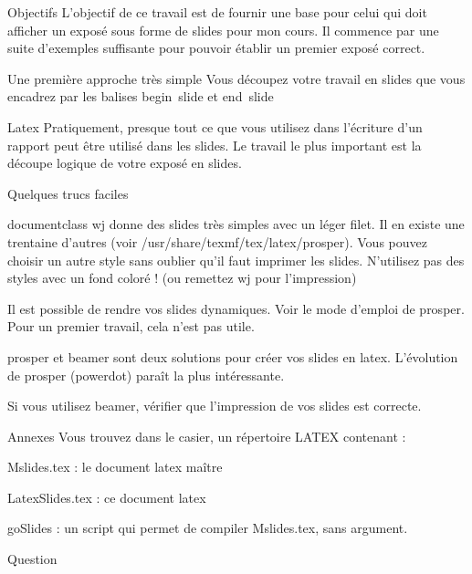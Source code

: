
\begin{slide}{Objectifs}
L'objectif de ce travail est de fournir une base pour celui qui doit afficher un exposé sous forme de slides pour mon cours. Il commence par une suite d'exemples suffisante pour pouvoir établir un premier exposé correct. 
\end{slide}
\begin{slide}{Une première approche très simple}
Vous découpez votre travail en slides que vous encadrez par les balises begin~slide et end~slide
\end{slide}
\begin{slide}{Latex}
Pratiquement, presque tout ce que vous utilisez dans l'écriture d'un rapport peut être utilisé dans les slides. Le travail le plus important est la découpe logique de votre exposé en slides.
\end{slide}
\begin{slide}{Quelques trucs faciles}
\begin{list}{-}{}
\item documentclass wj donne des slides très simples avec un léger filet. Il en existe une trentaine d'autres (voir /usr/share/texmf/tex/latex/prosper). Vous pouvez choisir un autre style sans oublier qu'il faut imprimer les slides. N'utilisez pas des styles avec un fond coloré ! (ou remettez wj pour l'impression)
\item Il est possible de rendre vos slides dynamiques. Voir le mode d'emploi de prosper. Pour un premier travail, cela n'est pas utile.
\item prosper et beamer sont deux solutions pour créer vos slides en latex. L'évolution de prosper (powerdot) paraît la plus intéressante. 
\item Si vous utilisez beamer, vérifier que l'impression de vos slides est correcte.
\end{list}
\end{slide}
\begin{slide}{Annexes}
Vous trouvez dans le casier, un répertoire LATEX contenant :
\begin{list}{-}{}
\item Mslides.tex : le document latex maître
\item LatexSlides.tex : ce document latex
\item goSlides : un script qui permet de compiler Mslides.tex, sans argument.
\end{list}
\end{slide}
\begin{slide}{Question}
~\\[3.5cm]
 \begin{center}
 \end{center}
\end{slide}
